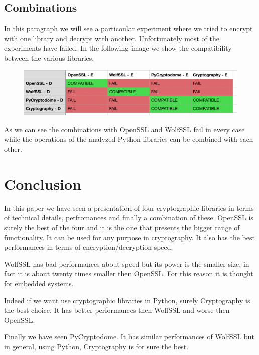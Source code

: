 \documentclass[11pt]{article}
\begin{document}
\subsection{Combinations}
In this paragraph we will see a particoular experiment where we tried to encrypt with one library and decrypt with another. Unfortunately most of the experiments have failed. In the following image we show the compatibility between the various libraries.

\begin{figure}[!ht]
  \includegraphics[width=1\textwidth]{pic4-hw4-1635747}
  \label{fig:Compatibility}
\end{figure}

As we can see the combinations with OpenSSL and WolfSSL fail in every case while the operations of the analyzed Python libraries can be combined with each other.

\section{Conclusion}
In this paper we have seen a presentation of four cryptographic libraries in terms of technical details, perfromances and finally a combination of these. OpenSSL is surely the best of the four and it is the one that presents the bigger range of functionality. It can be used for any purpose in cryptography. It also has the best performances in terms of encryption/decryption speed.

WolfSSL has bad performances about speed but its power is the smaller size, in fact it is about twenty times smaller then OpenSSL. For this reason it is thought for embedded systems.

Indeed if we want use cryptographic libraries in Python, surely Cryptography is the best choice. It has better performances then WolfSSL and worse then OpenSSL.

Finally we have seen PyCryptodome. It has similar performances of WolfSSL but in general, using Python, Cryptography is for sure the best.
\end{document}
